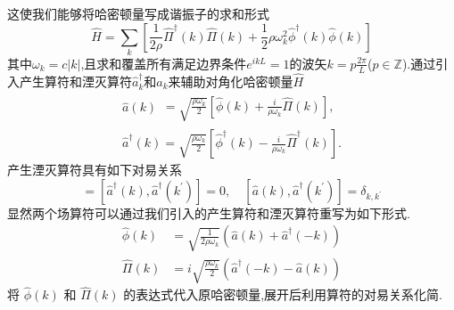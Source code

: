 这使我们能够将哈密顿量写成谐振子的求和形式
\begin{equation}
    \hat{H}=\sum_k\left[\frac{1}{2\rho}\hat{\Pi}^\dagger(k)\hat{\Pi}(k)+\frac{1}{2}\rho\omega_k^2\hat{\phi}^\dagger(k)\hat{\phi}(k)\right]
\end{equation}
其中$\omega_k = c|k|$,且求和覆盖所有满足边界条件$e^{ikL}=1$的波矢$k = p\frac{2\pi}{L}$($p\in\mathbb{Z}$).通过引入产生算符和湮灭算符$\hat{a}_k^\dagger$和$\hat{a}_k$来辅助对角化哈密顿量$\hat{H}$
\begin{equation}
    \begin{gathered}\hat{a}(k)\begin{aligned}=\sqrt{\frac{\rho\omega_k}{2}}\left[\hat{\phi}(k)+\frac{i}{\rho\omega_k}\hat{\Pi}(k)\right],\end{aligned}\\\hat{a}^{\dagger}(k)=\sqrt{\frac{\rho\omega_k}{2}}\left[\hat{\phi}^\dagger(k)-\frac{i}{\rho\omega_k}\hat{\Pi}^\dagger(k)\right].\end{gathered}
\end{equation}
产生湮灭算符具有如下对易关系
\begin{equation}
    [\hat{a}(k),\hat{a}(k^{\prime})]=[\hat{a}^\dagger(k),\hat{a}^\dagger(k^{\prime})]=0,\quad[\hat{a}(k),\hat{a}^\dagger(k^{\prime})]=\delta_{k,k^{\prime}}
\end{equation}
显然两个场算符可以通过我们引入的产生算符和湮灭算符重写为如下形式.
\begin{equation}
    \begin{aligned}
        \hat{\phi}(k) &= \sqrt{\frac{1}{2\rho \omega_k}} \left( \hat{a}(k) + \hat{a}^\dagger(-k) \right)\\
        \hat{\Pi}(k) &= i \sqrt{\frac{\rho \omega_k}{2}} \left( \hat{a}^\dagger(-k) - \hat{a}(k) \right)
    \end{aligned}
\end{equation}
将 $\hat{\phi}(k)$ 和 $\hat{\Pi}(k)$ 的表达式代入原哈密顿量,展开后利用算符的对易关系化简.

